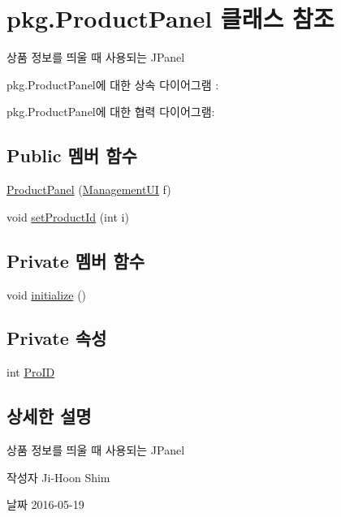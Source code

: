 \hypertarget{classpkg_1_1_product_panel}{}\section{pkg.\+Product\+Panel 클래스 참조}
\label{classpkg_1_1_product_panel}


상품 정보를 띄울 때 사용되는 J\+Panel  




pkg.\+Product\+Panel에 대한 상속 다이어그램 \+: 


pkg.\+Product\+Panel에 대한 협력 다이어그램\+:
\subsection*{Public 멤버 함수}
\begin{DoxyCompactItemize}
\item 
\hyperlink{classpkg_1_1_product_panel_a0eaeeef18948a6774914b322c2b545e5}{Product\+Panel} (\hyperlink{classpkg_1_1_management_u_i}{Management\+UI} f)
\item 
void \hyperlink{classpkg_1_1_product_panel_ae1cb96da7cd48c10f53c8c9f8e44d4d3}{set\+Product\+Id} (int i)
\end{DoxyCompactItemize}
\subsection*{Private 멤버 함수}
\begin{DoxyCompactItemize}
\item 
void \hyperlink{classpkg_1_1_product_panel_a5498108ea7a9cdb3172822e074e2dcb3}{initialize} ()
\end{DoxyCompactItemize}
\subsection*{Private 속성}
\begin{DoxyCompactItemize}
\item 
int \hyperlink{classpkg_1_1_product_panel_a24b4946f58b313219ef1521fa2b077f8}{Pro\+ID}
\end{DoxyCompactItemize}


\subsection{상세한 설명}
상품 정보를 띄울 때 사용되는 J\+Panel 

\begin{DoxyAuthor}{작성자}
Ji-\/\+Hoon Shim 
\end{DoxyAuthor}
\begin{DoxyDate}{날짜}
2016-\/05-\/19 
\end{DoxyDate}


